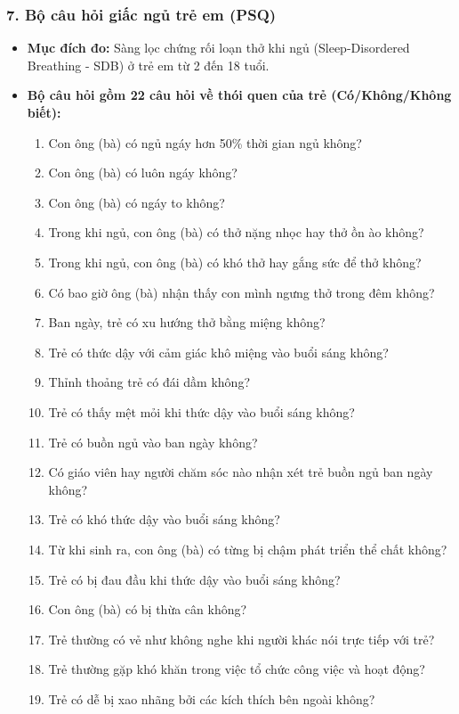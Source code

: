 \documentclass[12pt,a4paper]{article}
\begin{document}
\subsubsection*{7. Bộ câu hỏi giấc ngủ trẻ em (PSQ)}
\begin{itemize}
    \item \textbf{Mục đích đo:} Sàng lọc chứng rối loạn thở khi ngủ (Sleep-Disordered Breathing - SDB) ở trẻ em từ 2 đến 18 tuổi.
    \item \textbf{Bộ câu hỏi gồm 22 câu hỏi về thói quen của trẻ (Có/Không/Không biết):}
    \begin{enumerate}
        \item Con ông (bà) có ngủ ngáy hơn 50\% thời gian ngủ không?
        \item Con ông (bà) có luôn ngáy không?
        \item Con ông (bà) có ngáy to không?
        \item Trong khi ngủ, con ông (bà) có thở nặng nhọc hay thở ồn ào không?
        \item Trong khi ngủ, con ông (bà) có khó thở hay gắng sức để thở không?
        \item Có bao giờ ông (bà) nhận thấy con mình ngưng thở trong đêm không?
        \item Ban ngày, trẻ có xu hướng thở bằng miệng không?
        \item Trẻ có thức dậy với cảm giác khô miệng vào buổi sáng không?
        \item Thỉnh thoảng trẻ có đái dầm không?
        \item Trẻ có thấy mệt mỏi khi thức dậy vào buổi sáng không?
        \item Trẻ có buồn ngủ vào ban ngày không?
        \item Có giáo viên hay người chăm sóc nào nhận xét trẻ buồn ngủ ban ngày không?
        \item Trẻ có khó thức dậy vào buổi sáng không?
        \item Từ khi sinh ra, con ông (bà) có từng bị chậm phát triển thể chất không?
        \item Trẻ có bị đau đầu khi thức dậy vào buổi sáng không?
        \item Con ông (bà) có bị thừa cân không?
        \item Trẻ thường có vẻ như không nghe khi người khác nói trực tiếp với trẻ?
        \item Trẻ thường gặp khó khăn trong việc tổ chức công việc và hoạt động?
        \item Trẻ có dễ bị xao nhãng bởi các kích thích bên ngoài không?

\end{enumerate}
\end{itemize}
\end{document}
